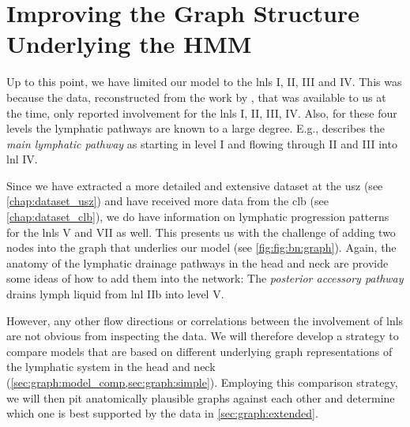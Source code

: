 \documentclass[\relativeRoot/main.tex]{subfiles}
\begin{document}
\chapter{Improving the Graph Structure Underlying the HMM}
\label{chap:graph}

Up to this point, we have limited our model to the \glspl{lnl} I, II, III and IV. This was because the data, reconstructed from the work by , that was available to us at the time, only reported involvement for the \glspl{lnl} I, II, III, IV. Also, for these four levels the lymphatic pathways are known to a large degree. E.g.,  describes the \emph{main lymphatic pathway} as starting in level I and flowing through II and III into \gls{lnl} IV.

Since we have extracted a more detailed and extensive dataset at the \gls{usz} (see \cref{chap:dataset_usz}) and have received more data from the \gls{clb} (see \cref{chap:dataset_clb}), we do have information on lymphatic progression patterns for the \glspl{lnl} V and VII as well. This presents us with the challenge of adding two nodes into the graph that underlies our model (see \cref{fig:fig:bn:graph}). Again, the anatomy of the lymphatic drainage pathways in the head and neck are provide some ideas of how to add them into the network: The \emph{posterior accessory pathway} drains lymph liquid from \gls{lnl} IIb into level V.

However, any other flow directions or correlations between the involvement of \glspl{lnl} are not obvious from inspecting the data. We will therefore develop a strategy to compare models that are based on different underlying graph representations of the lymphatic system in the head and neck (\cref{sec:graph:model_comp,sec:graph:simple}). Employing this comparison strategy, we will then pit anatomically plausible graphs against each other and determine which one is best supported by the data in \cref{sec:graph:extended}.




\end{document}
